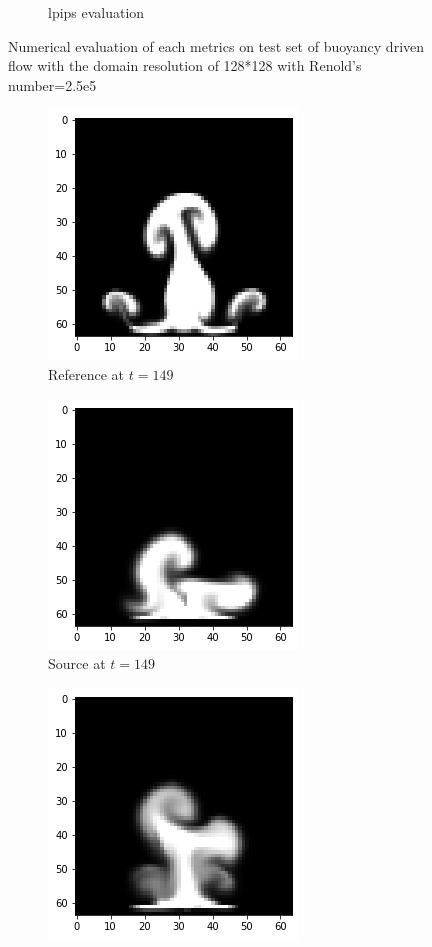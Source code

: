 \documentclass[a4paper,12pt,twoside]{report}
\begin{document}
\begin{figure}
\begin{subfigure}{0.32\textwidth}
		\caption{lpips evaluation}
	\end{subfigure}
	\caption{Numerical evaluation of each metrics on test set of buoyancy driven flow with the domain resolution of 128*128 with Renold's number=2.5e5}
		\end{figure}
	
	
	
	\begin{figure}
		\centering
		\begin{subfigure}{0.32\textwidth}
			\centering
			\includegraphics[scale=0.5]{buoyancy_low/ref}
			\caption{Reference at $t=149$}
		\end{subfigure}
		\begin{subfigure}{0.32\textwidth}
			\centering
			\includegraphics[scale=0.5]{buoyancy_low/source}
			\caption{Source at $t=149$}
		\end{subfigure}
		\begin{subfigure}{0.32\textwidth}
			\centering
			\includegraphics[scale=0.5]{buoyancy_low/mse}

\end{subfigure}
\end{figure}
\end{document}
